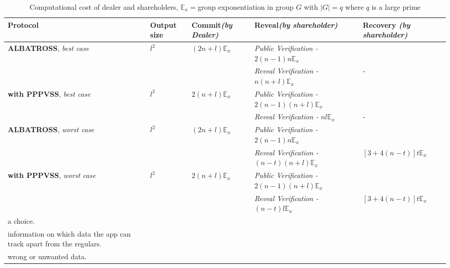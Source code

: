 \begin{table}[H]
\centering
\begin{tabular}{|p{3cm}|p{1.2cm}|p{2cm}|p{6.5cm}|p{2.5cm}|}
\hline
\textbf{Protocol}    & \textbf{Output size}    & 
\textbf{Commit}\textit{(by Dealer)} & \textbf{Reveal}\textit{(by 
shareholder)} & \textbf{Recovery} \textit{(by shareholder)}                                                           
\\ \hline
\textbf{ALBATROSS}, \textit{best case}    & $l^2$ & $(2n+l)\mathbb{E}_x$ & 
\textit{Public Verification - }$2(n-1)n\mathbb{E}_x$ & \\
& & & \textit{Reveal Verification - } $n(n+l)\mathbb{E}_x$&- \\ \hline
\textbf{with PPPVSS}, \textit{best case}    & $l^2$  & 
$2(n+l)\mathbb{E}_x$ & \textit{Public Verification - 
}$2(n-1)(n+l)\mathbb{E}_x$ &  \\
& & & \textit{Reveal Verification - } $nl\mathbb{E}_x$ & -  \\ \hline
\textbf{ALBATROSS}, \textit{worst case}    & $l^2$ & $(2n+l)\mathbb{E}_x$ 
& \textit{Public Verification - }$2(n-1)n\mathbb{E}_x$   &  \\
& & & \textit{Reveal Verification - }$(n-t)(n+l)\mathbb{E}_x$ & 
$[3+4(n-t)]t\mathbb{E}_{x}$\\ \hline
\textbf{with PPPVSS}, \textit{worst case}    & $l^2$  & 
$2(n+l)\mathbb{E}_x$ & \textit{Public Verification - 
}$2(n-1)(n+l)\mathbb{E}_x$ &  \\ 
& & & \textit{Reveal Verification - } $(n-t)l\mathbb{E}_x$ &  
$[3+4(n-t)]t\mathbb{E}_{x}$ \\ \hline

a choice.   \\ \hline
information on which data the app can track apart from the regulars. \\ 
\hline
wrong or unwanted data. \\ \hline

\end{tabular}
\caption{Computational cost of dealer and shareholders, 
$\mathbb{E}_x=$group exponentiation in group $G$ with $|G|=q$ where $q$ is 
a large prime}
\label{tab:comp_alba_pppvss_exp}
\end{table}


